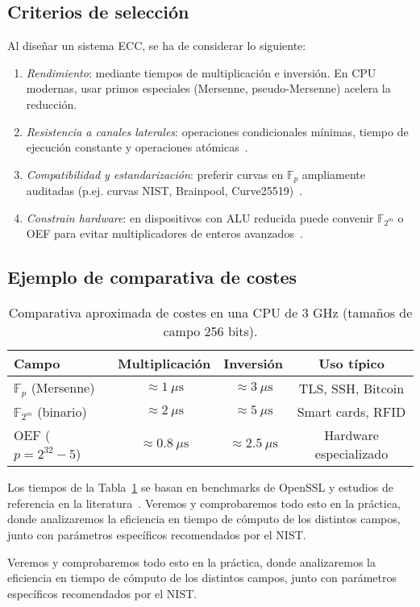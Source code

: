 \subsection*{Criterios de selección}
Al diseñar un sistema ECC, se ha de considerar lo siguiente:
\begin{enumerate}
  \item \emph{Rendimiento}: mediante tiempos de multiplicación e inversión. En CPU modernas, usar primos especiales (Mersenne, pseudo-Mersenne) acelera la reducción\citep{10.1007/11745853_14}.
  \item \emph{Resistencia a canales laterales}: operaciones condicionales mínimas, tiempo de ejecución constante y operaciones atómicas~\citep{kocher-sca}.
  \item \emph{Compatibilidad y estandarización}: preferir curvas en \(\mathbb{F}_p\) ampliamente auditadas (p.ej. curvas NIST, Brainpool, Curve25519)~\citep{cfrg-curves}.
  \item \emph{Constrain hardware}: en dispositivos con ALU reducida puede convenir \(\mathbb{F}_{2^m}\) o OEF para evitar multiplicadores de enteros avanzados~\citep{militzer-oef}.
\end{enumerate}

\subsection*{Ejemplo de comparativa de costes}

\begin{table}[H]
  \centering
  \begin{tabular}{lccc}
    \hline
    \textbf{Campo} & \textbf{Multiplicación} & \textbf{Inversión} & \textbf{Uso típico} \\
    \hline
    \(\mathbb{F}_p\) (Mersenne) & \(\approx1\ \mu\mathrm{s}\) & \(\approx3\ \mu\mathrm{s}\) & TLS, SSH, Bitcoin \\
    \(\mathbb{F}_{2^m}\) (binario) & \(\approx2\ \mu\mathrm{s}\) & \(\approx5\ \mu\mathrm{s}\) & Smart cards, RFID \\
    OEF (\(p=2^{32}-5\))          & \(\approx0.8\ \mu\mathrm{s}\)& \(\approx2.5\ \mu\mathrm{s}\)& Hardware especializado\\
    \hline
  \end{tabular}
  \caption{Comparativa aproximada de costes en una CPU de 3 GHz (tamaños de campo 256 bits).}
  \label{tab:comparativa_campos}
\end{table}

Los tiempos de la Tabla~\ref{tab:comparativa_campos} se basan en benchmarks de OpenSSL y estudios de referencia en la literatura~\citep{openssl-bench,hankerson2004}. Veremos y comprobaremos todo esto en la práctica, donde analizaremos la eficiencia en tiempo de cómputo de los distintos campos, junto con parámetros específicos recomendados por el NIST.

Veremos y comprobaremos todo esto en la práctica, donde analizaremos la eficiencia en tiempo de cómputo de los distintos campos, junto con parámetros específicos recomendados por el NIST.
